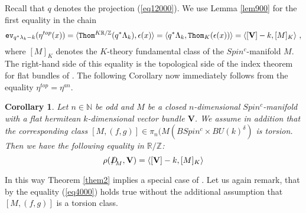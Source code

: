 \documentclass[12pt]{article}
\newtheorem{kor}[theorem]{Corollary}
\newcommand{\Thom}{{\tt Thom}}
\newcommand{\ev}{{\tt ev}}
\newcommand{\nat}{{\mathbb{N}}}
\newcommand{\Z}{{\mathbb{Z}}}
\newcommand{\R}{{\mathbb{R}}}
\newcommand{\bV}{{\mathbf{V}}}
\newcommand{\Dirac}{{D\hspace{-0.27cm}/}}
\begin{document}
Recall that $q$ denotes the projection  (\ref{eq12000}). We use Lemma
  \ref{lem900} for the first equality in the chain  $$\ev_{q^{*}\lambda_{k}-k}(\eta^{top}(x))=\langle\Thom^{K\R/\Z}(q^{*}\Lambda_{k}),\epsilon (x)\rangle=\langle q^{*}\Lambda_{k}, \Thom_{K}(\epsilon(x))\rangle=\langle [\bV]-k, [M]_{K}\rangle\ ,$$
  where $[M]_{K}$ denotes the $K$-theory fundamental class of the $Spin^{c}$-manifold $M$. 
The right-hand side of this equality  is the  topological side  of the index theorem for flat bundles of 
\cite[Thm. 5.3]{MR0397799}. 
The following Corollary now immediately  follows
from the equality $\eta^{top}=\eta^{an}$.
 \begin{kor}\label{cor45}
Let $n\in \nat$ be odd and  $M$ be a closed $n$-dimensional $Spin^{c}$-manifold with a flat hermitean $k$-dimensional vector bundle
 $\bV$. 
 We assume in addition that the corresponding class
 $[M,(f,g)]\in \pi_{n}(M(BSpin^{c}\times BU(k)^{\delta})$ is torsion.
 Then we have the following equality in $\R/\Z$:
\begin{equation}\label{eq4000}\rho(\Dirac_{M},\bV)=\langle[\bV]-k,[M]_{K}\rangle \end{equation}
\end{kor}
 In this way Theorem \ref{them2} implies a special case of
\cite[Thm. 5.3]{MR0397799}. Let us again remark, that by \cite[Thm. 5.3]{MR0397799}
the equality (\ref{eq4000}) holds true without the additional assumption that
 $[M,(f,g)]$ is a torsion class.















 
\end{document}
